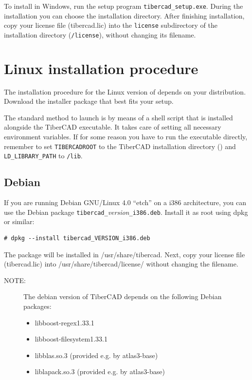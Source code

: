 To install \TiberCAD{} in Windows, run the setup program \verb+tibercad_setup.exe+.
During the installation you can choose the installation directory. After finishing
installation, copy your license file (tibercad.lic) into the \verb+license+ subdirectory
of the \TiberCAD{} installation directory (\instpath\verb+/license+), without changing
its filename.


\section*{Linux installation procedure}

The installation procedure for the Linux version of \TiberCAD{} depends on your
distribution. Download the installer package that best fits your setup.

 The standard method to launch \TiberCAD{} is by means of a shell script that is
installed alongside the TiberCAD executable. It takes care of setting all
necessary environment variables. If for some reason you have to run the executable
directly, remember to set \verb+TIBERCADROOT+ to the TiberCAD installation directory
(\instpath) and \verb+LD_LIBRARY_PATH+ to \instpath\verb+/lib+.

\subsection*{Debian}

If you are running Debian GNU/Linux 4.0 ``etch'' on a i386 architecture, you can use the
Debian package \verb+tibercad_+\textsl{version}\verb+_i386.deb+.
Install it as root using dpkg or similar:
\begin{verbatim}
# dpkg --install tibercad_VERSION_i386.deb
\end{verbatim}

  The package will be installed in /usr/share/tibercad. Next, copy your
license file (tibercad.lic) into /usr/share/tibercad/license/ without
changing the filename.


\begin{description}
\item[NOTE:] The debian version of TiberCAD depends on the following Debian packages:
 \begin{itemize}
   \item libboost-regex1.33.1
   \item libboost-filesystem1.33.1
   \item libblas.so.3 (provided e.g. by atlas3-base)
   \item liblapack.so.3 (provided e.g. by atlas3-base)
 \end{itemize}
\end{description}

